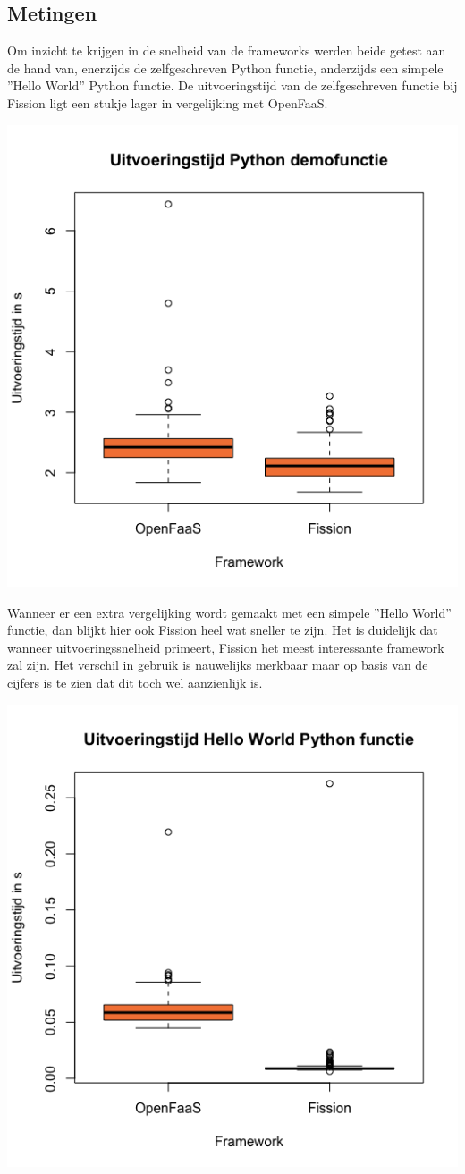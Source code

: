 \documentclass[a0,portrait]{a0poster}
\begin{document}
\begin{multicols}{2}
\section*{Metingen}
\color{black}
Om inzicht te krijgen in de snelheid van de frameworks werden beide getest aan de hand van, enerzijds de zelfgeschreven Python functie, anderzijds een simpele ''Hello World'' Python functie. De uitvoeringstijd van de zelfgeschreven functie bij Fission ligt een stukje lager in vergelijking met OpenFaaS. 

\begin{center}\vspace{1cm}
\includegraphics[width=0.5\linewidth]{boxplot-uitvoeringstijd-demofunctie}
\end{center}\vspace{1cm}

 Wanneer er een extra vergelijking wordt gemaakt met een simpele ''Hello World'' functie, dan blijkt hier ook Fission heel wat sneller te zijn. Het is duidelijk dat wanneer uitvoeringssnelheid primeert, Fission het meest interessante framework zal zijn. Het verschil in gebruik is nauwelijks merkbaar maar op basis van de cijfers is te zien dat dit toch wel aanzienlijk is.
 
\begin{center}\vspace{1cm}
    \includegraphics[width=0.5\linewidth]{boxplot-uitvoeringstijd-hellofunctie}
\end{center}\vspace{1cm}




\end{multicols}
\end{document}

